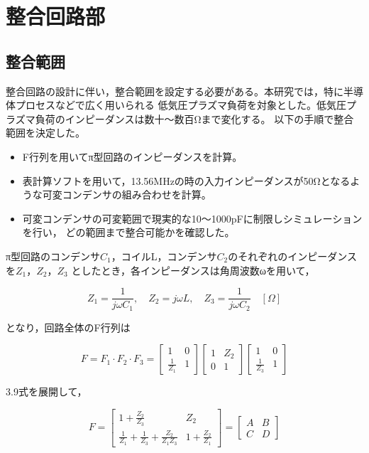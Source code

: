 \documentclass[uplatex, 12pt,oneside,openany]{ujbook}
\begin{document}
\section{整合回路部}
 \subsection{整合範囲}
 整合回路の設計に伴い，整合範囲を設定する必要がある。本研究では，特に半導体プロセスなどで広く用いられる
 低気圧プラズマ負荷を対象とした。低気圧プラズマ負荷のインピーダンスは数十～数百Ωまで変化する。
 以下の手順で整合範囲を決定した。
 \begin{itemize}
    \item F行列を用いてπ型回路のインピーダンスを計算。
    \item 表計算ソフトを用いて，13.56MHzの時の入力インピーダンスが50Ωとなるような可変コンデンサの組み合わせを計算。
    \item 可変コンデンサの可変範囲で現実的な10～1000pFに制限しシミュレーションを行い，
    どの範囲まで整合可能かを確認した。
\end{itemize}
 
 π型回路のコンデンサ$C_{1}$，コイルL，コンデンサ$C_{2}$のそれぞれのインピーダンスを$Z_{1}$，$Z_{2}$，$Z_{3}$
 としたとき，各インピーダンスは角周波数ωを用いて，

\begin{equation}
    Z_1 = \frac{1}{j \omega C_1}, \quad Z_2 = j \omega L, \quad Z_3 = \frac{1}{j \omega C_2} \quad [\Omega]
\end{equation}

となり，回路全体のF行列は

\begin{equation}
    F = F_1 \cdot F_2 \cdot F_3 = 
    \begin{bmatrix}
        1 & 0 \\
        \frac{1}{Z_1} & 1
    \end{bmatrix}
    \begin{bmatrix}
        1 & Z_2 \\
        0 & 1
    \end{bmatrix}
    \begin{bmatrix}
        1 & 0 \\
        \frac{1}{Z_3} & 1
    \end{bmatrix}
\end{equation}

3.9式を展開して，

\begin{equation}
    F = \begin{bmatrix}
        1 + \frac{Z_2}{Z_3} & Z_2 \\
        \frac{1}{Z_1} + \frac{1}{Z_3} + \frac{Z_2}{Z_1 Z_3} & 1 + \frac{Z_2}{Z_1}
    \end{bmatrix}
    = \begin{bmatrix}
        A & B \\
        C & D
    \end{bmatrix}
\end{equation}
\end{document}
